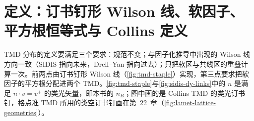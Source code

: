 \section{定义：订书钉形 Wilson 线、软因子、平方根恒等式与 Collins 定义}\label{sec:tmd-definitions}

TMD 分布的定义要满足三个要求：规范不变；与因子化推导中出现的 Wilson 线方向一致（SIDIS 指向未来，Drell--Yan 指向过去）；只把软区与共线区的重叠计算一次。前两点由订书钉形 Wilson 线（\cref{fig:tmd-staple}）实现，第三点要求把软因子的平方根分配进两个 TMD。\cref{fig:tmd-staple}与\cref{fig:sidis-dy-links}中的 $n$ 是满足 $n\cdot v=v^+$ 的类光矢量，即本书的 $n_B$；图中画的是 Collins TMD 的类光订书钉，格点准 TMD 所用的类空订书钉画在第~22~章（\cref{fig:lamet-lattice-geometries}）。

